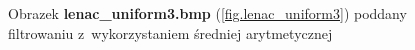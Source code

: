 \documentclass{classrep}
\begin{document}
\begin{figure}
{{  \label{fig.lenac_uniform3_average_5x5}
 }
}
\caption{Obrazek \textbf{lenac\_uniform3.bmp} (\ref{fig.lenac_uniform3}) poddany filtrowaniu z~wykorzystaniem średniej arytmetycznej}
\label{fig.lenac_uniform3_average}
\end{figure}
\end{document}
